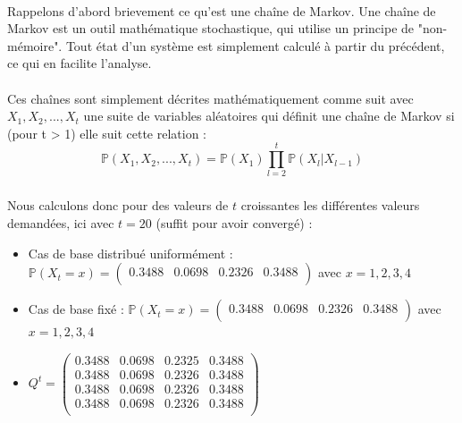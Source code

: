 \paragraph{}
Rappelons d'abord brievement ce qu'est une chaîne de Markov. Une chaîne de Markov est un outil mathématique stochastique, qui utilise un principe de "non-mémoire". Tout état d'un système est simplement calculé à partir du précédent, ce qui en facilite l'analyse.
\\\\
Ces chaînes sont simplement décrites mathématiquement comme suit avec $X_1, X_2,..., X_t$ une suite de variables aléatoires qui définit une chaîne de Markov
si (pour t > 1) elle suit cette relation :
\begin{equation*}
  \mathbb{P}(X_1, X_2, ..., X_t) = \mathbb{P}(X_1)\prod_{l = 2}^{t}\mathbb{P}(X_l | X_{l-1}) 
\end{equation*}

\subsubsection{}

Nous calculons donc pour des valeurs de $t$ croissantes les différentes valeurs demandées, ici avec $t = 20$ (suffit pour avoir convergé) :
\begin{itemize}
  \item Cas de base distribué uniformément : $\mathbb{P}(X_t = x) = 
  \begin{pmatrix}
    0.3488 & 0.0698 & 0.2326 & 0.3488\\
  \end{pmatrix}$ avec $x = 1, 2, 3, 4$
  \item Cas de base fixé : $\mathbb{P}(X_t = x) = 
  \begin{pmatrix}
    0.3488 & 0.0698 & 0.2326 & 0.3488\\
  \end{pmatrix}$ avec $x = 1, 2, 3, 4$
  \item $Q^t = 
  \begin{pmatrix}
  0.3488 & 0.0698 & 0.2325 & 0.3488\\
  0.3488 & 0.0698 & 0.2326 & 0.3488\\
  0.3488 & 0.0698 & 0.2326 & 0.3488\\
  0.3488 & 0.0698 & 0.2326 & 0.3488\\
  \end{pmatrix}$ 
\end{itemize}

